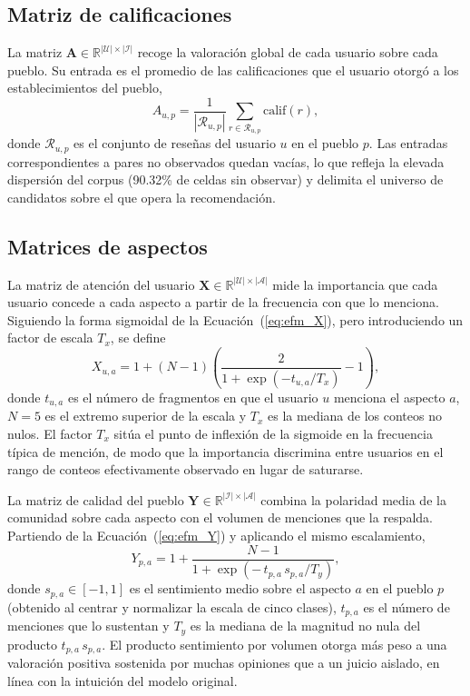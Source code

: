 \subsection*{Matriz de calificaciones}

La matriz $\mathbf{A} \in \mathbb{R}^{|\mathcal{U}| \times |\mathcal{I}|}$ recoge la valoración
global de cada usuario sobre cada pueblo. Su entrada es el promedio de las calificaciones que el
usuario otorgó a los establecimientos del pueblo,
\begin{equation}\label{eq:matrix_A}
	A_{u,p} = \frac{1}{|\mathcal{R}_{u,p}|} \sum_{r \in \mathcal{R}_{u,p}} \text{calif}(r),
\end{equation}
donde $\mathcal{R}_{u,p}$ es el conjunto de reseñas del usuario $u$ en el pueblo $p$. Las
entradas correspondientes a pares no observados quedan vacías, lo que refleja la elevada
dispersión del corpus (90.32\% de celdas sin observar) y delimita el universo de candidatos sobre
el que opera la recomendación.

\subsection*{Matrices de aspectos}

La matriz de atención del usuario $\mathbf{X} \in \mathbb{R}^{|\mathcal{U}| \times |\mathcal{A}|}$
mide la importancia que cada usuario concede a cada aspecto a partir de la frecuencia con que lo
menciona. Siguiendo la forma sigmoidal de la Ecuación~(\ref{eq:efm_X}), pero introduciendo un
factor de escala $T_x$, se define
\begin{equation}\label{eq:matrix_X}
	X_{u,a} = 1 + (N - 1) \left( \frac{2}{1 + \exp(-t_{u,a} / T_x)} - 1 \right),
\end{equation}
donde $t_{u,a}$ es el número de fragmentos en que el usuario $u$ menciona el aspecto $a$, $N=5$
es el extremo superior de la escala y $T_x$ es la mediana de los conteos no nulos. El factor
$T_x$ sitúa el punto de inflexión de la sigmoide en la frecuencia típica de mención, de modo que
la importancia discrimina entre usuarios en el rango de conteos efectivamente observado en lugar
de saturarse.

La matriz de calidad del pueblo $\mathbf{Y} \in \mathbb{R}^{|\mathcal{I}| \times |\mathcal{A}|}$
combina la polaridad media de la comunidad sobre cada aspecto con el volumen de menciones que la
respalda. Partiendo de la Ecuación~(\ref{eq:efm_Y}) y aplicando el mismo escalamiento,
\begin{equation}\label{eq:matrix_Y}
	Y_{p,a} = 1 + \frac{N - 1}{1 + \exp\!\left(-\, t_{p,a}\, s_{p,a} / T_y \right)},
\end{equation}
donde $s_{p,a} \in [-1, 1]$ es el sentimiento medio sobre el aspecto $a$ en el pueblo $p$
(obtenido al centrar y normalizar la escala de cinco clases), $t_{p,a}$ es el número de menciones
que lo sustentan y $T_y$ es la mediana de la magnitud no nula del producto $t_{p,a}\, s_{p,a}$.
El producto sentimiento por volumen otorga más peso a una valoración positiva sostenida por
muchas opiniones que a un juicio aislado, en línea con la intuición del modelo original.


